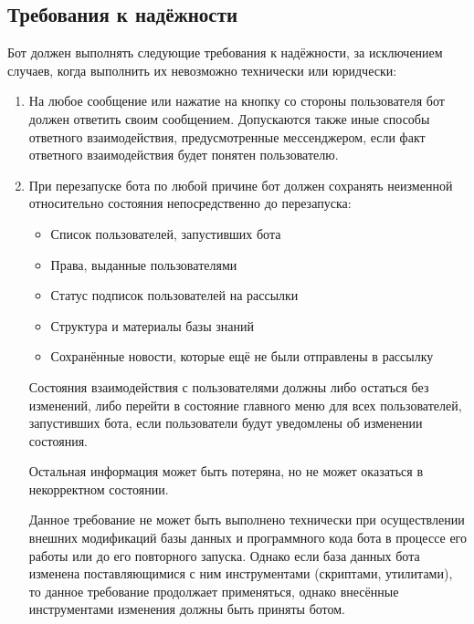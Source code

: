 \subsection{Требования к надёжности}
\label{sec:req:reliab}
Бот должен выполнять следующие требования к надёжности, за исключением случаев,
когда выполнить их невозможно технически или юридчески:
\begin{enumerate}
    \item
        На любое сообщение или нажатие на кнопку со стороны пользователя бот должен ответить
        своим сообщением. Допускаются также иные способы ответного взаимодействия, предусмотренные
        мессенджером, если факт ответного взаимодействия будет понятен пользователю.
    \item
        При перезапуске бота по любой причине бот должен сохранять неизменной относительно
        состояния непосредственно до перезапуска:
        \begin{itemize}
            \item
                Список пользователей, запустивших бота
            \item
                Права, выданные пользователями
            \item
                Статус подписок пользователей на рассылки
            \item
                Структура и материалы базы знаний
            \item
                Сохранённые новости, которые ещё не были отправлены в рассылку
        \end{itemize}

        Состояния взаимодействия с пользователями должны либо остаться без изменений, либо перейти
        в состояние главного меню для всех пользователей, запустивших бота, если
        пользователи будут уведомлены об изменении состояния.

        Остальная информация может быть потеряна, но не может оказаться в некорректном состоянии.

        Данное требование не может быть выполнено технически при осуществлении внешних модификаций базы
        данных и программного кода бота в процессе его работы или до его повторного запуска.
        Однако если база данных бота изменена поставляющимися с ним инструментами (скриптами, утилитами),
        то данное требование продолжает применяться, однако внесённые инструментами изменения должны
        быть приняты ботом.


\end{enumerate}
